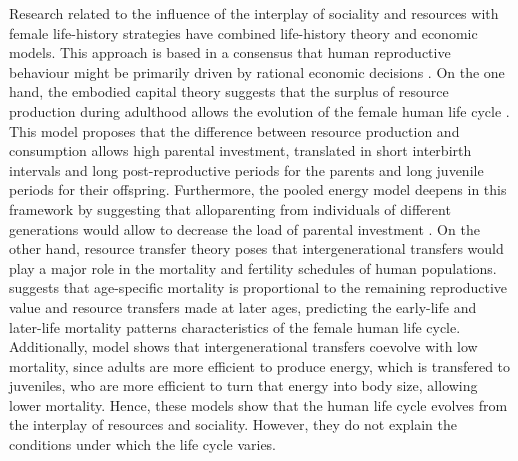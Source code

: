 \documentclass{article}
\begin{document}
Research related to the influence of the interplay of sociality and resources with female life-history strategies have combined life-history theory and economic models. This approach is based in a consensus that human reproductive behaviour might be primarily driven by rational economic decisions \citep{jones2015resource}. On the one hand, the embodied capital theory suggests that the surplus of resource production during adulthood allows the evolution of the female human life cycle \citep{kaplan2000theory}. This model proposes that the difference between resource production and consumption allows high parental investment, translated in short interbirth intervals and long post-reproductive periods for the parents and long juvenile periods for their offspring. Furthermore, the pooled energy model deepens in this framework by suggesting that alloparenting from individuals of different generations would allow to decrease the load of parental investment \citep{kramer2010pooled}. On the other hand, resource transfer theory poses that intergenerational transfers would play a major role in the mortality and fertility schedules of human populations. \cite{lee2003rethinking} suggests that age-specific mortality is proportional to the remaining reproductive value and resource transfers made at later ages, predicting the early-life and later-life mortality patterns characteristics of the female human life cycle. Additionally, \cite{chu2006co} model shows that intergenerational transfers coevolve with low mortality, since adults are more efficient to produce energy, which is transfered to juveniles, who are more efficient to turn that energy into body size, allowing lower mortality. Hence, these models show that the human life cycle evolves from the interplay of resources and sociality. However, they do not explain the conditions under which the life cycle varies.
\\\\
\end{document}
